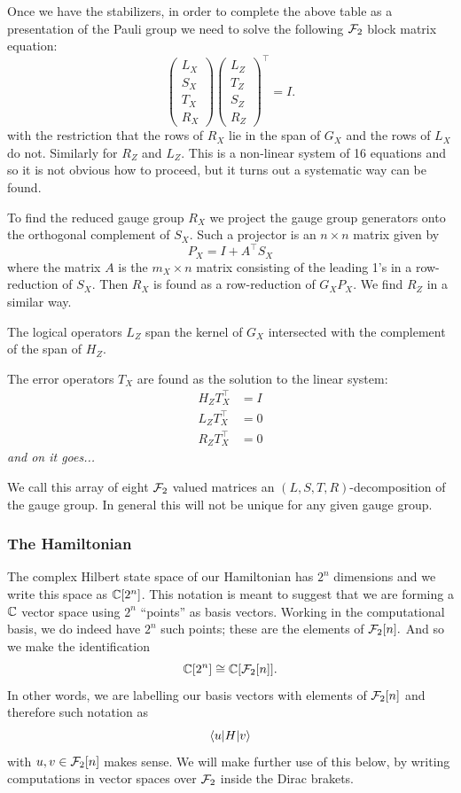\documentclass[12pt]{article}
\begin{document}
Once we have the stabilizers, in order to
complete the above table as a presentation
of the Pauli group we need to solve the
following $\mathcal{F}_2$ block matrix equation:
$$
\left( \begin{array}{l}
L_X\\
S_X\\
T_X\\
R_X
\end{array} \right)
\left( \begin{array}{l}
L_Z\\
T_Z\\
S_Z\\
R_Z
\end{array} \right)^\top =
I.
$$
with the restriction that the rows of
$R_X$ lie in the span of $G_X$ and
the rows of $L_X$ do not. Similarly
for $R_Z$ and $L_Z.$
This is a non-linear system of 16 equations and so it
is not obvious how to proceed, but it turns out a
systematic way can be found.

To find the reduced gauge group $R_X$ we project the gauge
group generators onto the orthogonal complement of $S_X.$
Such a projector is an $n\times n$
matrix given by
$$
    P_X = I + A^\top S_X
$$
where the matrix $A$ is the $m_X\times n$ matrix consisting of
the leading 1's in a row-reduction of $S_X.$
Then $R_X$ is found as a row-reduction of $G_X P_X.$
We find $R_Z$ in a similar way.

The logical operators $L_Z$ 
span the kernel of $G_X$ intersected with the complement
of the span of $H_Z.$

The error operators $T_X$ are found as the solution
to the linear system:
\begin{align*}
    H_Z T_X^\top &= I \\
    L_Z T_X^\top &= 0 \\
    R_Z T_X^\top &= 0
\end{align*}
\emph{and on it goes...}

We call this array of eight $\mathcal{F}_2$
valued matrices 
an $(L,S,T,R)$-decomposition of the gauge group.
In general this will not be unique for
any given gauge group.

\subsubsection{The Hamiltonian}

The complex Hilbert state space of our
Hamiltonian has $2^n$ dimensions and we
write this space as $\mathbb{C}[2^n]$.
This notation is meant to suggest that
we are forming a $\mathbb{C}$ vector space
using $2^n$ ``points'' 
as basis vectors.
Working in the computational basis,
we do indeed have $2^n$ such points; 
these are the elements of $\mathcal{F}_2[n].$
And so we make the identification
$$
    \mathbb{C}[2^n] \cong \mathbb{C}[\mathcal{F}_2[n]].
$$
In other words, we are labelling 
our basis vectors with elements of $\mathcal{F}_2[n]$
and therefore such notation as
$$
    \langle{u}| H |{v}\rangle
$$
with $u, v \in \mathcal{F}_2[n]$ makes sense.
We will make further use of this below,
by writing computations in vector
spaces over $\mathcal{F}_2$ inside the Dirac brakets.
\end{document}
